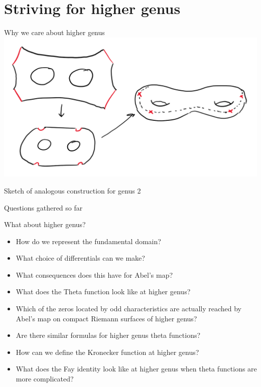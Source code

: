 \documentclass[11pt,aspectratio=169]{beamer}
\begin{document}
\section{Striving for higher genus}

\begin{frame}{Why we care about higher genus}
    \center{}
    \includegraphics[width=0.7\columnwidth]{assets/MyGenus2.png}

    \tiny Sketch of analogous construction for genus 2
\end{frame}

\begin{frame}{Questions gathered so far}
    {
        \begin{block}{What about higher genus?}
            \begin{itemize}
                \item How do we represent the fundamental domain?
                \item What choice of differentials can we make?
                \item What consequences does this have for Abel's map?
                \item What does the Theta function look like at higher genus?
                \item Which of the zeros located by odd characteristics are actually reached by Abel's map on compact Riemann surfaces of higher genus?
                \item Are there similar formulas for higher genus theta functions?
                \item How can we define the Kronecker function at higher genus?
                \item What does the Fay identity look like at higher genus when theta functions are more complicated?
            \end{itemize}
        \end{block}
    }
\end{frame}
\end{document}

